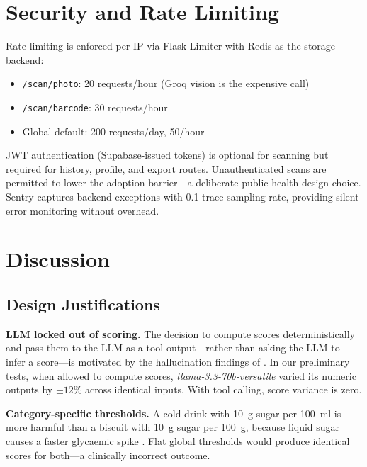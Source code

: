 \documentclass[conference]{IEEEtran}
\begin{document}
\section{Security and Rate Limiting}

Rate limiting is enforced per-IP via Flask-Limiter with Redis as the storage backend:

\begin{itemize}
  \item \texttt{/scan/photo}: 20 requests/hour (Groq vision is the expensive call)
  \item \texttt{/scan/barcode}: 30 requests/hour
  \item Global default: 200 requests/day, 50/hour
\end{itemize}

JWT authentication (Supabase-issued tokens) is optional for scanning but required
for history, profile, and export routes. Unauthenticated scans are permitted
to lower the adoption barrier---a deliberate public-health design choice.
Sentry captures backend exceptions with 0.1 trace-sampling rate, providing
silent error monitoring without overhead.

\section{Discussion}

\subsection{Design Justifications}

\textbf{LLM locked out of scoring.} The decision to compute scores deterministically
and pass them to the LLM as a tool output---rather than asking the LLM to infer
a score---is motivated by the hallucination findings of \citeauthor{llm_nutrition_2024}
\cite{llm_nutrition_2024}. In our preliminary tests, when allowed to compute scores,
\textit{llama-3.3-70b-versatile} varied its numeric outputs by $\pm\!12$\% across
identical inputs. With tool calling, score variance is zero.

\textbf{Category-specific thresholds.} A cold drink with 10~g sugar per 100~ml
is more harmful than a biscuit with 10~g sugar per 100~g, because liquid
sugar causes a faster glycaemic spike \cite{liquid_sugar}. Flat global thresholds
would produce identical scores for both---a clinically incorrect outcome.
\end{document}
